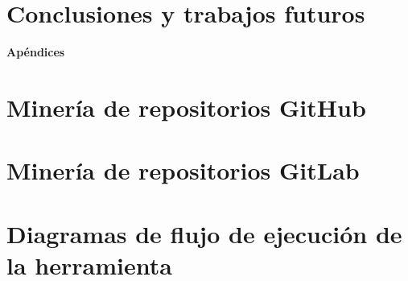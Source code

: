 \documentclass[12pt,twoside,titlepage]{report}
\newcommand\blankpage{%
    \newpage
    \null
    \thispagestyle{empty}%
    \newpage}
\begin{document}


\blankpage


\chapter{Conclusiones y trabajos futuros}



\blankpage



{}

\footnotesize{
%


}



\raggedbottom
\afterpage{\blankpage}

\newpage





\appendix

{}

\mbox{}
\vfill
\begin{center}
\begin{Huge}
\textbf{Apéndices}
\end{Huge}
\end{center}
\vfill
\mbox{}
\thispagestyle{empty}

\newpage
\mbox{}
\thispagestyle{empty}
\newpage


\chapter{Minería de repositorios GitHub}
\label{sec:apendice1}



\chapter{Minería de repositorios GitLab}
\label{sec:apendice2}



\chapter{Diagramas de flujo de ejecución de la herramienta}
\label{sec:apendice3}
\end{document}

